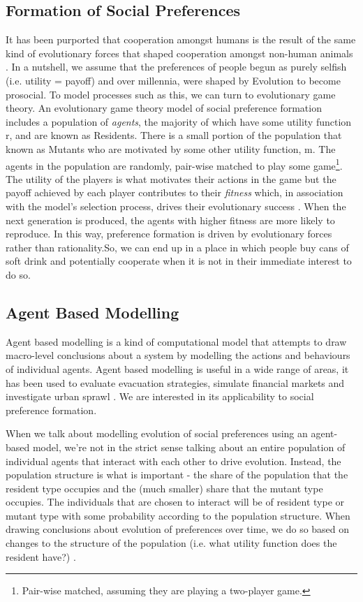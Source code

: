 \documentclass[11pt]{article}
\newcommand*{\np}{\par\noindent\newline}
\begin{document}
\subsection{Formation of Social Preferences}\label{formation_social_preferences}
It has been purported that cooperation amongst humans is the result of the same
kind of evolutionary forces that shaped cooperation amongst non-human animals
\cite{silk_evolution_2016}. In a nutshell, we assume that the preferences of
people begun as purely selfish (i.e. utility = payoff) and over millennia, were
shaped by Evolution to become prosocial. To model processes such as this, we
can turn to evolutionary game theory. An evolutionary game theory model of
social preference formation includes a population of \textit{agents}, the
majority of which have some utility function r, and are known as Residents.
There is a small portion of the population that known as Mutants who are
motivated by some other utility function, m. The agents in the population are
randomly, pair-wise matched to play some game\footnote{Pair-wise matched,
assuming they are playing a two-player game.}. The utility of the players is
what motivates their actions in the game but the  payoff achieved by each
player contributes to their \textit{fitness} which, in association with the
model's selection process, drives their evolutionary success . When the next
generation is produced, the agents with higher fitness are more likely to
reproduce. In this way, preference formation is driven by evolutionary
forces rather than rationality.So, we can end up in a place in which people
buy cans of soft drink and potentially cooperate when it is not in their
immediate interest to do so.

\subsection{Agent Based Modelling}\label{abm}
Agent based modelling is a kind of computational model that attempts to draw
macro-level conclusions about a system by modelling the actions and behaviours
of individual agents. Agent based modelling is useful in a wide range of areas,
it has been used to evaluate evacuation strategies\cite{taylor_agent-based_2014},
simulate financial markets \cite{deissenberg_eurace:_2008} and investigate
urban sprawl \cite{brown_effects_2006}. We are interested in its applicability
to social preference formation.

\np When we talk about modelling evolution of social preferences using an
agent-based model, we're not in the strict sense talking about an entire
population of individual agents that interact with each other to drive
evolution. Instead, the population structure is what is important - the share
of the population that the resident type occupies and the (much smaller) share
that the mutant type occupies. The individuals that are chosen to interact will
be of resident type or mutant type with some probability according to the
population structure. When drawing conclusions about evolution of preferences
over time, we do so based on changes to the structure of the population (i.e.
what utility function does the resident have?) \cite{shoham_multiagent_nodate}.
\end{document}
